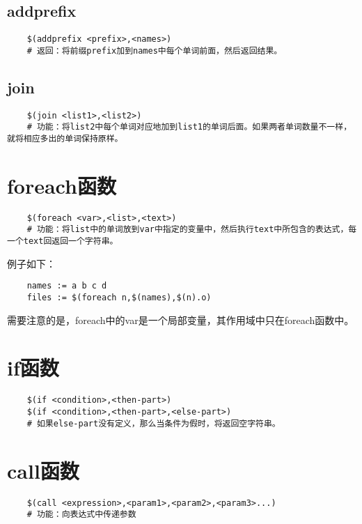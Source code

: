 \documentclass[a4paper,left=2.5cm,right=2.5cm,11pt]{article}
\begin{document}
\subsection{addprefix}
	\begin{lstlisting}
	$(addprefix <prefix>,<names>)
	# 返回：将前缀prefix加到names中每个单词前面，然后返回结果。
	\end{lstlisting}

\subsection{join}
	\begin{lstlisting}
	$(join <list1>,<list2>)
	# 功能：将list2中每个单词对应地加到list1的单词后面。如果两者单词数量不一样，就将相应多出的单词保持原样。
	\end{lstlisting}

\section{foreach函数}
	\begin{lstlisting}
	$(foreach <var>,<list>,<text>)
	# 功能：将list中的单词放到var中指定的变量中，然后执行text中所包含的表达式，每一个text回返回一个字符串。
	\end{lstlisting}

	例子如下：
	\begin{lstlisting}
	names := a b c d
	files := $(foreach n,$(names),$(n).o)
	\end{lstlisting}

	需要注意的是，foreach中的var是一个局部变量，其作用域中只在foreach函数中。

\section{if函数}
	\begin{lstlisting}
	$(if <condition>,<then-part>)
	$(if <condition>,<then-part>,<else-part>)
	# 如果else-part没有定义，那么当条件为假时，将返回空字符串。
	\end{lstlisting}

\section{call函数}
	\begin{lstlisting}
	$(call <expression>,<param1>,<param2>,<param3>...)
	# 功能：向表达式中传递参数
	\end{lstlisting}
\end{document}
